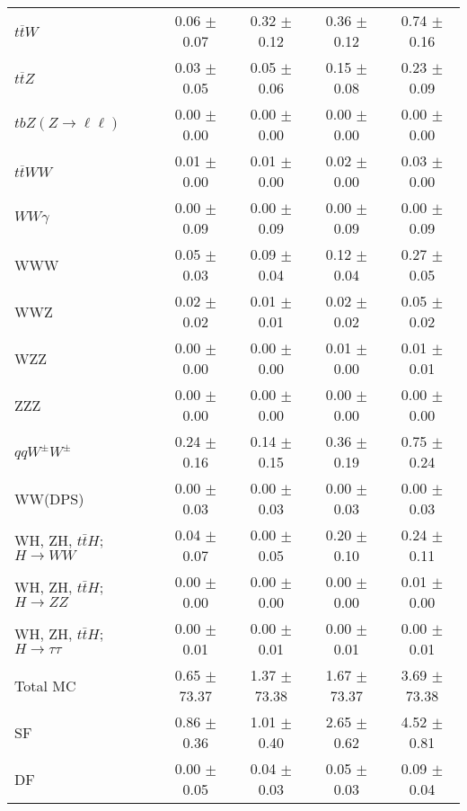 \begin{tabular}{l|cccc}
                   $t\overline{t}W$ &  0.06 $\pm$  0.07 &  0.32 $\pm$  0.12 &  0.36 $\pm$  0.12 &  0.74 $\pm$  0.16 \\
                   $t\overline{t}Z$ &  0.03 $\pm$  0.05 &  0.05 $\pm$  0.06 &  0.15 $\pm$  0.08 &  0.23 $\pm$  0.09 \\
    $tbZ (Z \rightarrow \ell \ell)$ &  0.00 $\pm$  0.00 &  0.00 $\pm$  0.00 &  0.00 $\pm$  0.00 &  0.00 $\pm$  0.00 \\
                  $t\overline{t}WW$ &  0.01 $\pm$  0.00 &  0.01 $\pm$  0.00 &  0.02 $\pm$  0.00 &  0.03 $\pm$  0.00 \\
                         $WW\gamma$ &  0.00 $\pm$  0.09 &  0.00 $\pm$  0.09 &  0.00 $\pm$  0.09 &  0.00 $\pm$  0.09 \\
                                WWW &  0.05 $\pm$  0.03 &  0.09 $\pm$  0.04 &  0.12 $\pm$  0.04 &  0.27 $\pm$  0.05 \\
                                WWZ &  0.02 $\pm$  0.02 &  0.01 $\pm$  0.01 &  0.02 $\pm$  0.02 &  0.05 $\pm$  0.02 \\
                                WZZ &  0.00 $\pm$  0.00 &  0.00 $\pm$  0.00 &  0.01 $\pm$  0.00 &  0.01 $\pm$  0.01 \\
                                ZZZ &  0.00 $\pm$  0.00 &  0.00 $\pm$  0.00 &  0.00 $\pm$  0.00 &  0.00 $\pm$  0.00 \\
                 $qqW^{\pm}W^{\pm}$ &  0.24 $\pm$  0.16 &  0.14 $\pm$  0.15 &  0.36 $\pm$  0.19 &  0.75 $\pm$  0.24 \\
                            WW(DPS) &  0.00 $\pm$  0.03 &  0.00 $\pm$  0.03 &  0.00 $\pm$  0.03 &  0.00 $\pm$  0.03 \\
WH, ZH, $t\bar{t}H$; $H \rightarrow WW$ &  0.04 $\pm$  0.07 &  0.00 $\pm$  0.05 &  0.20 $\pm$  0.10 &  0.24 $\pm$  0.11 \\
WH, ZH, $t\bar{t}H$; $H \rightarrow ZZ$ &  0.00 $\pm$  0.00 &  0.00 $\pm$  0.00 &  0.00 $\pm$  0.00 &  0.01 $\pm$  0.00 \\
WH, ZH, $t\bar{t}H$; $H \rightarrow \tau\tau$ &  0.00 $\pm$  0.01 &  0.00 $\pm$  0.01 &  0.00 $\pm$  0.01 &  0.00 $\pm$  0.01 \\
\hline\hline
                           Total MC &  0.65 $\pm$ 73.37 &  1.37 $\pm$ 73.38 &  1.67 $\pm$ 73.37 &  3.69 $\pm$ 73.38 \\
\hline
                                 SF &  0.86 $\pm$  0.36 &  1.01 $\pm$  0.40 &  2.65 $\pm$  0.62 &  4.52 $\pm$  0.81 \\
                                 DF &  0.00 $\pm$  0.05 &  0.04 $\pm$  0.03 &  0.05 $\pm$  0.03 &  0.09 $\pm$  0.04 \\

\end{tabular}

